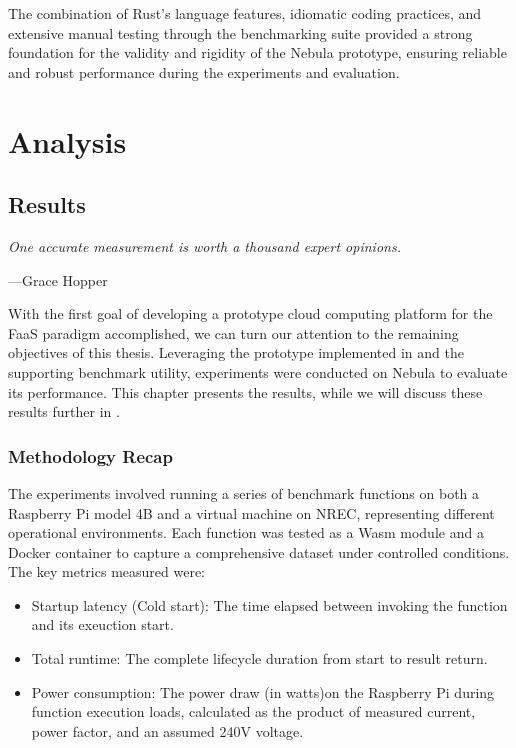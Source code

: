 \documentclass[
  table]{report}
\providecommand{\tightlist}{%
  \setlength{\itemsep}{0pt}\setlength{\parskip}{0pt}}
\begin{document}
The combination of Rust's language features, idiomatic coding practices,
and extensive manual testing through the benchmarking suite provided a
strong foundation for the validity and rigidity of the Nebula prototype,
ensuring reliable and robust performance during the experiments and
evaluation.

\part{Analysis}

\newpage
\chapter{Results}
\label{chap:results}

\setlength{} 
\epigraph{\itshape  
One accurate measurement is worth a thousand expert opinions.
}{---Grace Hopper}

With the first goal of developing a prototype cloud computing platform
for the \ac{FaaS} paradigm accomplished, we can turn our attention to
the remaining objectives of this thesis. Leveraging the prototype
implemented in  and the supporting benchmark
utility, experiments were conducted on Nebula to evaluate its
performance. This chapter presents the results, while we will discuss
these results further in .

\section{Methodology Recap}

The experiments involved running a series of benchmark functions on both
a Raspberry Pi model 4B and a virtual machine on \ac{NREC}, representing
different operational environments. Each function was tested as a
\ac{Wasm} module and a Docker container to capture a comprehensive
dataset under controlled conditions. The key metrics measured were:

\begin{itemize}
\tightlist
\item
  Startup latency (Cold start): The time elapsed between invoking the
  function and its exeuction start.
\item
  Total runtime: The complete lifecycle duration from start to result
  return.
\item
  Power consumption: The power draw (in watts)on the Raspberry Pi during
  function execution loads, calculated as the product of measured
  current, power factor, and an assumed 240V voltage.
\end{itemize}
\end{document}
